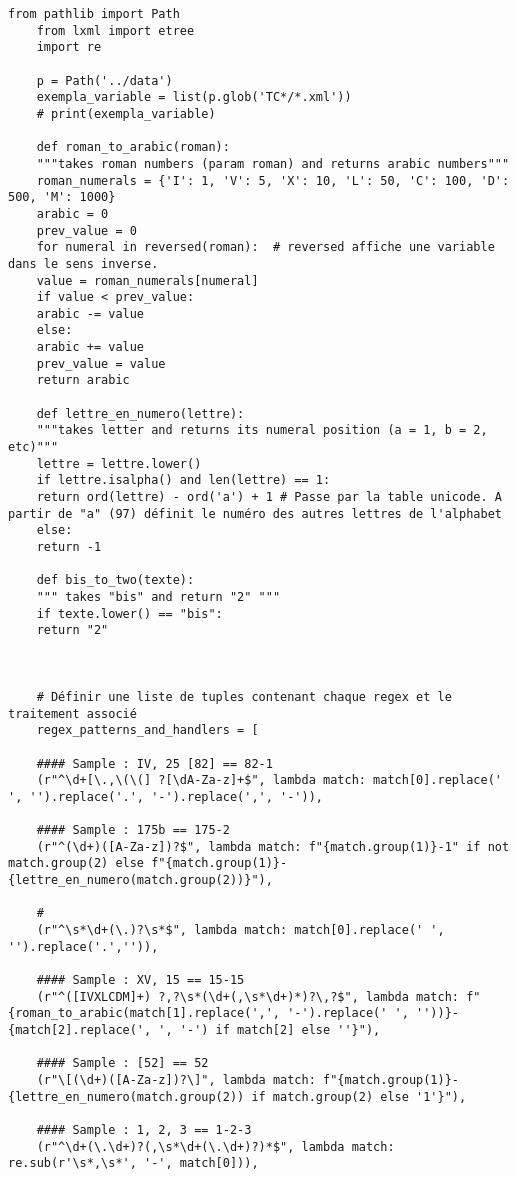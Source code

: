 \begin{lstlisting}[breaklines=true]
	from pathlib import Path
	from lxml import etree
	import re
	
	p = Path('../data')
	exempla_variable = list(p.glob('TC*/*.xml'))
	# print(exempla_variable)
	
	def roman_to_arabic(roman):
	"""takes roman numbers (param roman) and returns arabic numbers"""
	roman_numerals = {'I': 1, 'V': 5, 'X': 10, 'L': 50, 'C': 100, 'D': 500, 'M': 1000}
	arabic = 0
	prev_value = 0
	for numeral in reversed(roman):  # reversed affiche une variable dans le sens inverse.
	value = roman_numerals[numeral]
	if value < prev_value:
	arabic -= value
	else:
	arabic += value
	prev_value = value
	return arabic
	
	def lettre_en_numero(lettre):
	"""takes letter and returns its numeral position (a = 1, b = 2, etc)"""
	lettre = lettre.lower()
	if lettre.isalpha() and len(lettre) == 1:
	return ord(lettre) - ord('a') + 1 # Passe par la table unicode. A partir de "a" (97) définit le numéro des autres lettres de l'alphabet
	else:
	return -1
	
	def bis_to_two(texte):
	""" takes "bis" and return "2" """
	if texte.lower() == "bis":
	return "2"
	
	
	
	# Définir une liste de tuples contenant chaque regex et le traitement associé
	regex_patterns_and_handlers = [
	
	#### Sample : IV, 25 [82] == 82-1
	(r"^\d+[\.,\(\(] ?[\dA-Za-z]+$", lambda match: match[0].replace(' ', '').replace('.', '-').replace(',', '-')),
	
	#### Sample : 175b == 175-2
	(r"^(\d+)([A-Za-z])?$", lambda match: f"{match.group(1)}-1" if not match.group(2) else f"{match.group(1)}-{lettre_en_numero(match.group(2))}"),
	
	# 
	(r"^\s*\d+(\.)?\s*$", lambda match: match[0].replace(' ', '').replace('.','')),
	
	#### Sample : XV, 15 == 15-15
	(r"^([IVXLCDM]+) ?,?\s*(\d+(,\s*\d+)*)?\,?$", lambda match: f"{roman_to_arabic(match[1].replace(',', '-').replace(' ', ''))}-{match[2].replace(', ', '-') if match[2] else ''}"),
	
	#### Sample : [52] == 52 
	(r"\[(\d+)([A-Za-z])?\]", lambda match: f"{match.group(1)}-{lettre_en_numero(match.group(2)) if match.group(2) else '1'}"), 
	
	#### Sample : 1, 2, 3 == 1-2-3
	(r"^\d+(\.\d+)?(,\s*\d+(\.\d+)?)*$", lambda match: re.sub(r'\s*,\s*', '-', match[0])),
	

\end{lstlisting}
